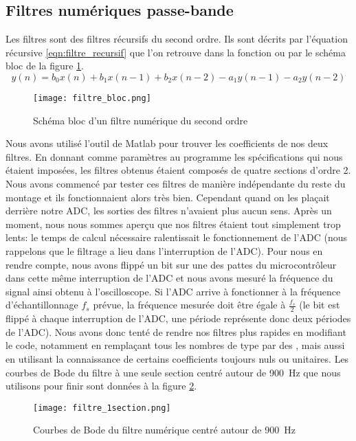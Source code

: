\subsection{Filtres numériques passe-bande}
Les filtres sont des filtres récursifs du second ordre. Ils sont décrits par l'équation récursive \ref{eqn:filtre_recursif} que l'on retrouve dans la fonction  ou par le schéma bloc de la figure \ref{fig:filtre_bloc}.
\begin{equation}
y(n) = b_0x(n) + b_1x(n-1) + b_2x(n-2) - a_1y(n-1) - a_2y(n-2)
\label{eqn:filtre_recursif}
\end{equation}
\begin{figure}[htbp]
\centering
\texttt{[image: filtre\_bloc.png]}
\caption{Schéma bloc d'un filtre numérique du second ordre}
\label{fig:filtre_bloc}
\end{figure}

Nous avons utilisé l'outil  de Matlab pour trouver les coefficients de nos deux filtres. En donnant comme paramètres au programme les spécifications qui nous étaient imposées, les filtres obtenus étaient composés de quatre sections d'ordre 2. Nous avons commencé par tester ces filtres de manière indépendante du reste du montage et ils fonctionnaient alors très bien. Cependant quand on les plaçait derrière notre ADC, les sorties des filtres n'avaient plus aucun sens. Après un moment, nous nous sommes aperçu que nos filtres étaient tout simplement trop lents: le temps de calcul nécessaire ralentissait le fonctionnement de l'ADC (nous rappelons que le filtrage a lieu dans l'interruption de l'ADC). Pour nous en rendre compte, nous avons flippé un bit sur une des pattes du microcontrôleur dans cette même interruption de l'ADC et nous avons mesuré la fréquence du signal ainsi obtenu à l'oscilloscope. Si l'ADC arrive à fonctionner à la fréquence d'échantillonnage $f_s$  prévue, la fréquence mesurée doit être égale à $\frac{f_s}{2}$ (le bit est flippé à chaque interruption de l'ADC, une période représente donc deux périodes de l'ADC). Nous avons donc tenté de rendre nos filtres plus rapides en modifiant le code, notamment en remplaçant tous les nombres de type  par des , mais aussi en utilisant la connaissance de certains coefficients toujours nuls ou unitaires. Les courbes de Bode du filtre à une seule section centré autour de \SI{900}{\hertz} que nous utilisons pour finir sont données à la figure \ref{fig:filtre_1section}.
\begin{figure}[htbp]
\centering
\texttt{[image: filtre\_1section.png]}
\caption{Courbes de Bode du filtre numérique centré autour de \SI{900}{\hertz}}
\label{fig:filtre_1section}
\end{figure}

